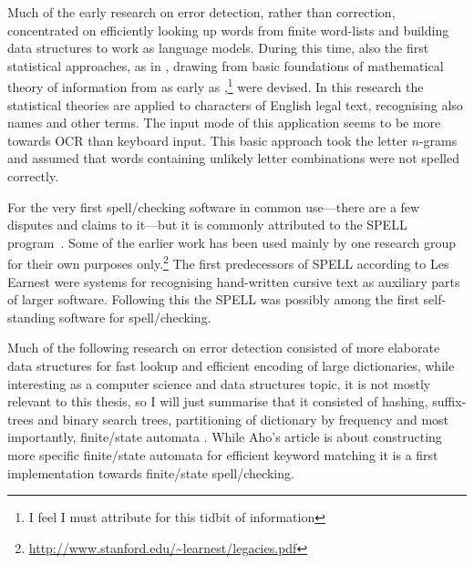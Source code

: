 \documentclass[officiallayout]{unihelcompling}
\begin{document}
Much of the early research on error detection, rather than correction,
concentrated on efficiently looking up words from finite word-lists and
building data structures to work as \glspl{language model}. During this time,
also the first statistical approaches, as in \citet{raviv1967decision}, drawing
from basic foundations of mathematical theory of information from as early as
\citet{shannon1948mathematical},\footnote{I feel I must attribute
\citet{liberman2012noisily} for this tidbit of information} were devised. In
this research the statistical theories are applied to characters of English
legal text, recognising also names and other terms. The input mode of this
application seems to be more towards OCR than keyboard input. This basic
approach took the letter \(n\)-grams and assumed that words containing unlikely
letter combinations were not spelled correctly.

For the very first spell\-/checking software in common use---there are a few
disputes and claims to it---but it is commonly attributed to the SPELL
program~\citep{gorin1971spell}.  Some of the earlier work has been used mainly
by one research group for their own purposes
only.\footnote{\url{http://www.stanford.edu/~learnest/legacies.pdf}} The first
predecessors of SPELL according to Les Earnest were systems for recognising
hand-written cursive text as auxiliary parts of larger software. Following this
the SPELL was possibly among the first self-standing software for
spell\-/checking.


Much of the following research on error detection consisted of more elaborate
data structures for fast lookup and efficient encoding of large dictionaries,
while interesting as a computer science and data structures topic, it is not
mostly relevant to this thesis, so I will just summarise that it consisted of
hashing, suffix-trees and binary search trees, partitioning of dictionary by
frequency \citep{knuth1973art} and most importantly, finite\-/state automata
\citep{aho1975efficient}. While Aho's article is about constructing more
specific finite\-/state automata for efficient keyword matching it is a first
implementation towards finite\-/state spell\-/checking.
\end{document}
